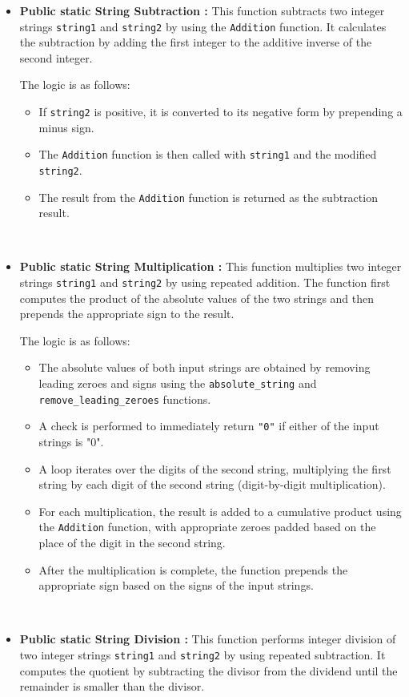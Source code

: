 \documentclass{article}
\begin{document}
\begin{itemize}
\item \textbf{Public static String Subtraction :} This function subtracts two integer strings \texttt{string1} and \texttt{string2} by using the \texttt{Addition} function. It calculates the subtraction by adding the first integer to the additive inverse of the second integer.

The logic is as follows:
\begin{itemize}
    \item If \texttt{string2} is positive, it is converted to its negative form by prepending a minus sign.
    \item The \texttt{Addition} function is then called with \texttt{string1} and the modified \texttt{string2}.
    \item The result from the \texttt{Addition} function is returned as the subtraction result.
\end{itemize}\\

\item \textbf{Public static String Multiplication :} This function multiplies two integer strings \texttt{string1} and \texttt{string2} by using repeated addition. The function first computes the product of the absolute values of the two strings and then prepends the appropriate sign to the result.

The logic is as follows:
\begin{itemize}
    \item The absolute values of both input strings are obtained by removing leading zeroes and signs using the \texttt{absolute\_string} and \texttt{remove\_leading\_zeroes} functions.
    \item A check is performed to immediately return \texttt{"0"} if either of the input strings is "0".
    \item A loop iterates over the digits of the second string, multiplying the first string by each digit of the second string (digit-by-digit multiplication).
    \item For each multiplication, the result is added to a cumulative product using the \texttt{Addition} function, with appropriate zeroes padded based on the place of the digit in the second string.
    \item After the multiplication is complete, the function prepends the appropriate sign based on the signs of the input strings.
\end{itemize}\\

\item \textbf{Public static String Division :} This function performs integer division of two integer strings \texttt{string1} and \texttt{string2} by using repeated subtraction. It computes the quotient by subtracting the divisor from the dividend until the remainder is smaller than the divisor.


\end{itemize}
\end{document}
